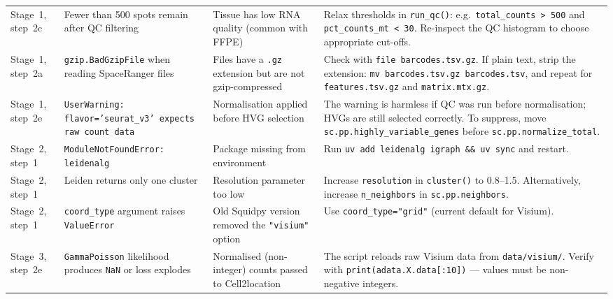\documentclass[12pt, a4paper]{article}
\begin{document}
\begin{longtable}{p{1.6cm} p{3.8cm} p{3.8cm} p{5.4cm}}
Stage~1, step~2c &
Fewer than 500 spots remain after QC filtering &
Tissue has low RNA quality (common with FFPE) &
Relax thresholds in \texttt{run\_qc()}: e.g.\
\texttt{total\_counts > 500} and \texttt{pct\_counts\_mt < 30}.
Re-inspect the QC histogram to choose appropriate cut-offs. \\[4pt]

Stage~1, step~2a &
\texttt{gzip.BadGzipFile} when reading SpaceRanger files &
Files have a \texttt{.gz} extension but are not gzip-compressed &
Check with \texttt{file barcodes.tsv.gz}. If plain text, strip the
extension: \texttt{mv barcodes.tsv.gz barcodes.tsv}, and repeat for
\texttt{features.tsv.gz} and \texttt{matrix.mtx.gz}. \\[4pt]

Stage~1, step~2e &
\texttt{UserWarning: flavor='seurat\_v3' expects raw count data} &
Normalisation applied before HVG selection &
The warning is harmless if QC was run before normalisation; HVGs are
still selected correctly. To suppress, move
\texttt{sc.pp.highly\_variable\_genes} before
\texttt{sc.pp.normalize\_total}. \\[4pt]

Stage~2, step~1 &
\texttt{ModuleNotFoundError: leidenalg} &
Package missing from environment &
Run \texttt{uv add leidenalg igraph \&\& uv sync} and restart. \\[4pt]

Stage~2, step~1 &
Leiden returns only one cluster &
Resolution parameter too low &
Increase \texttt{resolution} in \texttt{cluster()} to 0.8--1.5.
Alternatively, increase \texttt{n\_neighbors} in
\texttt{sc.pp.neighbors}. \\[4pt]

Stage~2, step~1 &
\texttt{coord\_type} argument raises \texttt{ValueError} &
Old Squidpy version removed the \texttt{"visium"} option &
Use \texttt{coord\_type="grid"} (current default for Visium). \\[4pt]

Stage~3, step~2e &
\texttt{GammaPoisson} likelihood produces \texttt{NaN} or loss explodes &
Normalised (non-integer) counts passed to Cell2location &
The script reloads raw Visium data from \texttt{data/visium/}.
Verify with \texttt{print(adata.X.data[:10])} — values must be
non-negative integers. \\[4pt]


\end{longtable}
\end{document}
